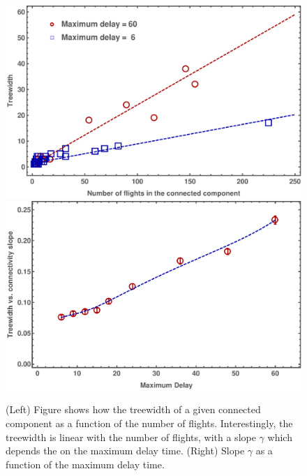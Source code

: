 \begin{figure}
  \includegraphics[width=\columnwidth]{pics/instances/treewidth_connectivity.pdf}
  \includegraphics[width=\columnwidth]{pics/instances/treewidth_pl.pdf}
  \caption{\label{fig:tw_vs_cc}(Left) Figure shows how the treewidth of a given
  connected component as a function of the number of flights. Interestingly, the
  treewidth is linear with the number of flights, with a slope $\gamma$ which
  depends the on the maximum delay time. (Right) Slope $\gamma$ as a function
  of the maximum delay time.}
\end{figure}


